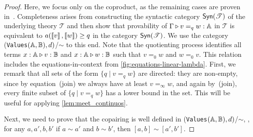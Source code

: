 \begin{proof}
  Here, we focus only on the coproduct, as the remaining cases are proven in~\cite{dahlqvist2023syntactic}.
  Completeness arises from constructing the syntactic category $\mathsf{Syn}(\mathscr{T})$ of the underlying  theory
  $\mathscr{T}$ and then show that provability of $\Gamma \triangleright v =_q w : \mathbb{A}$
  in $\mathscr{T}$ is equivalent to $a(\left \llbracket v \right \rrbracket,\left \llbracket w \right \rrbracket) \geq q$ in the category
  $\mathsf{Syn}(\mathscr{T})$. We use the category (\texttt{Values}$(\mathbb{A},\mathbb{B}),d)$/$\sim$ to this end.  Note that the quotienting process identifies all terms $x : \mathbb{A} \triangleright v : \mathbb{B}$ and $x : \mathbb{A} \triangleright w : \mathbb{B}$ such that $v =_0 w$ and $w =_0 v$. This relation includes the equations-in-context from \autoref{fig:equations-linear-lambda}.
     First, we remark that all sets of the form $\{ q \mid v =_q w \}$ are directed: they are non-empty, since by equation~(join) we always have at least $v =_{\infty} w$, and again by~(join), every finite subset of $\{ q \mid v =_q w \}$ has a lower bound in the set. This will be useful for applying \autoref{lem:meet_continuos}.
   
   Next, we need to prove that the copairing is well defined in (\texttt{Values}$(\mathbb{A},\mathbb{B}),d)$/$\sim$, \ie, for any $a, a', b, b'$ if $a\sim a'$ and $b\sim b'$, then $[a,b] \sim [a',b']$. 


\end{proof}
